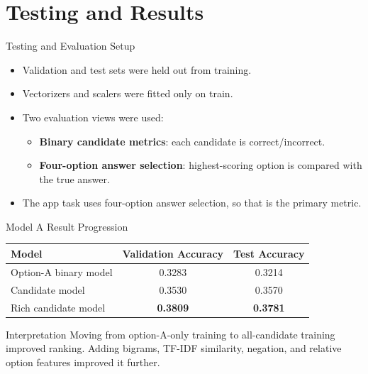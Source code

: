 \documentclass[aspectratio=169,11pt]{beamer}
\begin{document}
\section{Testing and Results}

\begin{frame}{Testing and Evaluation Setup}
    \begin{itemize}
        \item Validation and test sets were held out from training.
        \item Vectorizers and scalers were fitted only on train.
        \item Two evaluation views were used:
        \begin{itemize}
            \item \textbf{Binary candidate metrics}: each candidate is correct/incorrect.
            \item \textbf{Four-option answer selection}: highest-scoring option is compared with the true answer.
        \end{itemize}
        \item The app task uses four-option answer selection, so that is the primary metric.
    \end{itemize}
\end{frame}

\begin{frame}{Model A Result Progression}
    \begin{table}
        \centering
        \small
        \begin{tabular}{lcc}
            \toprule
            \textbf{Model} & \textbf{Validation Accuracy} & \textbf{Test Accuracy} \\
            \midrule
            Option-A binary model & 0.3283 & 0.3214 \\
            Candidate model & 0.3530 & 0.3570 \\
            Rich candidate model & \textbf{0.3809} & \textbf{0.3781} \\
            \bottomrule
        \end{tabular}
    \end{table}

    \begin{block}{Interpretation}
        Moving from option-A-only training to all-candidate training improved ranking.
        Adding bigrams, TF-IDF similarity, negation, and relative option features improved it further.
    \end{block}
\end{frame}
\end{document}
